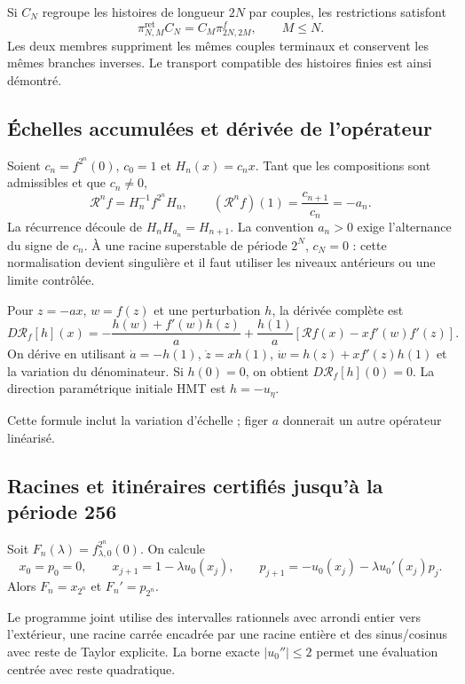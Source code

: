 Si \(C_N\) regroupe les histoires de longueur \(2N\) par couples, les restrictions satisfont
\[
\pi^{\mathrm{ret}}_{N,M}C_N
=C_M\pi^f_{2N,2M},\qquad M\le N.
\]
Les deux membres suppriment les mêmes couples terminaux et conservent les mêmes branches inverses. Le transport compatible des histoires finies est ainsi démontré.


\subsection{Échelles accumulées et dérivée de l’opérateur}
\label{hmtfg:desarrollo:6}

Soient \(c_n=f^{2^n}(0)\), \(c_0=1\) et \(H_n(x)=c_nx\). Tant que les compositions sont admissibles et que \(c_n\ne0\),
\[
\boxed{\mathcal R^nf=H_n^{-1}f^{2^n}H_n},\qquad
(\mathcal R^nf)(1)=\frac{c_{n+1}}{c_n}=-a_n.
\]
La récurrence découle de \(H_nH_{a_n}=H_{n+1}\). La convention \(a_n>0\) exige l’alternance du signe de \(c_n\). À une racine superstable de période \(2^N\), \(c_N=0\) : cette normalisation devient singulière et il faut utiliser les niveaux antérieurs ou une limite contrôlée.

Pour \(z=-ax\), \(w=f(z)\) et une perturbation \(h\), la dérivée complète est
\[
\boxed{
D\mathcal R_f[h](x)=
-\frac{h(w)+f'(w)h(z)}a+
\frac{h(1)}a
\left[\mathcal Rf(x)-xf'(w)f'(z)\right].
}
\]
On dérive en utilisant \(\dot a=-h(1)\), \(\dot z=xh(1)\),
\(\dot w=h(z)+xf'(z)h(1)\) et la variation du dénominateur. Si \(h(0)=0\), on obtient \(D\mathcal R_f[h](0)=0\). La direction paramétrique initiale HMT est \(h=-u_\eta\).

Cette formule inclut la variation d’échelle ; figer \(a\) donnerait un autre opérateur linéarisé.


\subsection{Racines et itinéraires certifiés jusqu’à la période 256}
\label{hmtfg:desarrollo:7}

Soit \(F_n(\lambda)=f_{\lambda,0}^{2^n}(0)\). On calcule
\[
x_0=p_0=0,\qquad x_{j+1}=1-\lambda u_0(x_j),\qquad
p_{j+1}=-u_0(x_j)-\lambda u_0'(x_j)p_j.
\]
Alors \(F_n=x_{2^n}\) et \(F_n'=p_{2^n}\).

Le programme joint utilise des intervalles rationnels avec arrondi entier vers l’extérieur, une racine carrée encadrée par une racine entière et des sinus/cosinus avec reste de Taylor explicite. La borne exacte \(|u_0''|\le2\) permet une évaluation centrée avec reste quadratique.

